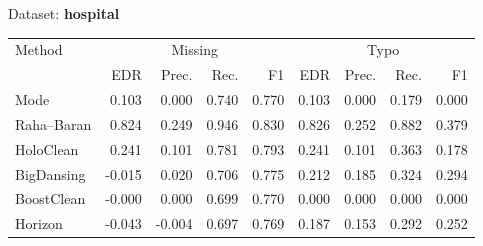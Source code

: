 \begin{subtable}[t]{0.492\linewidth}
\caption{Dataset: \textbf{hospital}}
\label{tab:q1-acc-hospital}
\centering
\begin{tabular}{lrrrrrrrr}
\toprule
\multirow{2}{*}{Method} &\multicolumn{4}{c}{Missing} &\multicolumn{4}{c}{Typo}\\
\cmidrule(lr){2-5}\cmidrule(l){6-9}
 & EDR & Prec. & Rec. & F1 & EDR & Prec. & Rec. & F1\\
\midrule
\midrule
Mode & 0.103 & 0.000 & 0.740 & 0.770 & 0.103 & 0.000 & 0.179 & 0.000 \\
Raha–Baran & 0.824 & 0.249 & 0.946 & 0.830 & 0.826 & 0.252 & 0.882 & 0.379 \\
HoloClean & 0.241 & 0.101 & 0.781 & 0.793 & 0.241 & 0.101 & 0.363 & 0.178 \\
BigDansing & -0.015 & 0.020 & 0.706 & 0.775 & 0.212 & 0.185 & 0.324 & 0.294 \\
BoostClean & -0.000 & 0.000 & 0.699 & 0.770 & 0.000 & 0.000 & 0.000 & 0.000 \\
Horizon & -0.043 & -0.004 & 0.697 & 0.769 & 0.187 & 0.153 & 0.292 & 0.252 \\
\bottomrule
\bottomrule
\end{tabular}
\end{subtable}